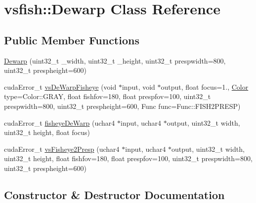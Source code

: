 \hypertarget{classvsfish_1_1Dewarp}{}\section{vsfish\+:\+:Dewarp Class Reference}
\label{classvsfish_1_1Dewarp}
\subsection*{Public Member Functions}
\begin{DoxyCompactItemize}
\item 
\hyperlink{classvsfish_1_1Dewarp_a4624fc20f5e6cd8fc5bf483a8ccf6ee8}{Dewarp} (uint32\+\_\+t \+\_\+width, uint32\+\_\+t \+\_\+height, uint32\+\_\+t prespwidth=800, uint32\+\_\+t prespheight=600)
\item 
cuda\+Error\+\_\+t \hyperlink{classvsfish_1_1Dewarp_a428c47122248f265405e96a242467a23}{vs\+De\+Warp\+Fisheye} (void $\ast$input, void $\ast$output, float focus=1., \hyperlink{namespacevsfish_a2db8e5547732b077dd979a4ec9031a3e}{Color} type=Color\+::\+G\+R\+AY, float fishfov=180, float prespfov=100, uint32\+\_\+t prespwidth=800, uint32\+\_\+t prespheight=600, Func func=Func\+::\+F\+I\+S\+H2\+P\+R\+E\+SP)
\item 
cuda\+Error\+\_\+t \hyperlink{classvsfish_1_1Dewarp_ae938e5029af906d061cb8da1375ab013}{fisheye\+De\+Warp} (uchar4 $\ast$input, uchar4 $\ast$output, uint32\+\_\+t width, uint32\+\_\+t height, float focus)
\item 
cuda\+Error\+\_\+t \hyperlink{classvsfish_1_1Dewarp_af958416eef4deaac7ed55a5964e42b60}{vs\+Fisheye2\+Presp} (uchar4 $\ast$input, uchar4 $\ast$output, uint32\+\_\+t width, uint32\+\_\+t height, float fishfov=180, float prespfov=100, uint32\+\_\+t prespwidth=800, uint32\+\_\+t prespheight=600)
\end{DoxyCompactItemize}


\subsection{Constructor \& Destructor Documentation}
